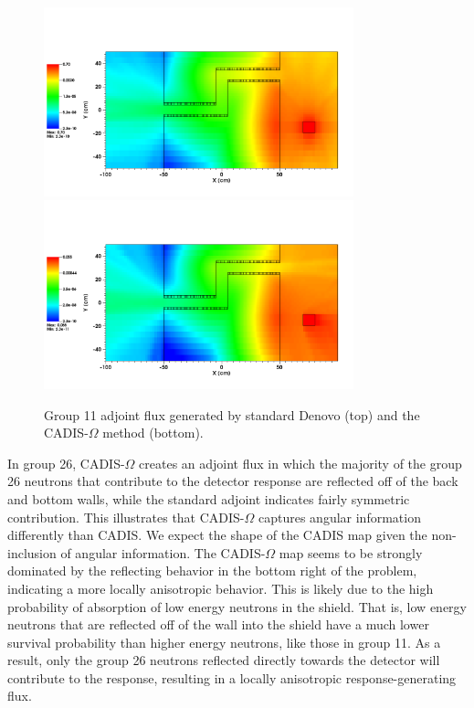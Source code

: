 \documentclass[12pt]{article}
\begin{document}
\begin{figure}
  \begin{center}
    \includegraphics[width=0.80\textwidth]{./images/maze2_adjoint_group11_adjusted.png}
    \includegraphics[width=0.80\textwidth]{./images/maze2_myflux_group11_adjusted.png}
    \caption[]{\label{fig::adjoint_fluxes_group11} Group 11 adjoint flux generated by standard Denovo (top) and the CADIS-$\Omega$ method (bottom).}
  \end{center}
\end{figure}

In group 26, CADIS-$\Omega$ creates an adjoint flux in which the majority of the group 26 neutrons that contribute to the detector response are reflected off of the back and bottom walls, while the standard adjoint indicates fairly symmetric contribution. 
This illustrates that CADIS-$\Omega$ captures angular information differently than CADIS. 
We expect the shape of the CADIS map given the non-inclusion of angular information. 
The CADIS-$\Omega$ map seems to be strongly dominated by the reflecting behavior in the bottom right of the problem, indicating a more locally anisotropic behavior. This is likely due to the high probability of absorption of low energy neutrons in the shield. That is, low energy neutrons that are reflected off of the wall into the shield have a much lower survival probability than higher energy neutrons, like those in group 11. As a result, only the group 26 neutrons reflected directly towards the detector will contribute to the response, resulting in a locally anisotropic response-generating flux. 
\end{document}

